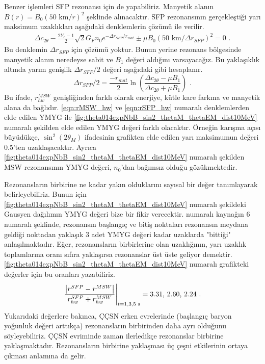 Benzer işlemleri SFP rezonansı için de yapabiliriz. Manyetik alanın $ B(r) = B_{0}(50 \text{ km}/r)^{2} $ şeklinde alınacaktır. SFP rezonansının gerçekleştiği yarı maksimum uzaklıkları aşağıdaki denklemlerin çözümü ile verilir.
\begin{align}
    \Delta c_{2\theta} - \frac{2Y_{e}-1}{2}\sqrt{2}G_{F}n_{0}e^{-\Delta r_{SFP}/r_{mat}}\pm \mu B_{0}(50 \text{ km}/\Delta r_{SFP})^{2} = 0\text{ .}
\end{align}
Bu denklemin $ \Delta r_{SFP} $ için çözümü yoktur. Bunun yerine rezonans bölgesinde manyetik alanın neredeyse sabit ve $ B_{1} $ değeri aldığını varsayacağız. Bu yaklaşıklık altında yarım genişlik $ \Delta r_{SFP}/2 $ değeri aşağıdaki gibi hesaplanır.
\begin{equation}\label{eqn:rSFP_hw}
    \Delta r_{SFP}/2 = \frac{-r_{mat}}{2} \ln(\frac{\Delta c_{2\theta}-\mu B_{1}}{\Delta c_{2\theta}+\mu B_{1}})\text{ .}
\end{equation}
Bu ifade, $ r^{MSW}_{hw} $ genişliğinden farklı olarak enerjiye, kütle kare farkına ve manyetik alana da bağlıdır. \eqref{eqn:rMSW_hw} ve \eqref{eqn:rSFP_hw} numaralı denklemlerden elde edilen YMYG ile \ref{fig:theta014expNbB_sin2_thetaM_thetaEM_dist10MeV} numaralı şekilden elde edilen YMYG değeri farklı olacaktır. Örneğin karışma açısı büyüdükçe, $ \sin^{2}(2\theta_{M}) $ ifadesinin grafikten elde edilen yarı maksimumun değeri $ 0.5 $'ten uzaklaşacaktır. Ayrıca \ref{fig:theta014expNbB_sin2_thetaM_thetaEM_dist10MeV} numaralı şekilden MSW rezonansının YMYG değeri, $ n_{0} $'dan bağımsız olduğu gözükmektedir.

Rezonansların birbirine ne kadar yakın olduklarını sayısal bir değer tanımlayarak belirleyebiliriz. Bunun için \ref{fig:theta014expNbB_sin2_thetaM_thetaEM_dist10MeV} numaralı şekildeki Gausyen dağılımın YMYG değeri bize bir fikir verecektir. \cite{Smirnov:2003da} numaralı kaynağın 6 numaralı şeklinde, rezonansın başlangıç ve bitiş noktaları rezonansın meydana geldiği noktadan yaklaşık $3$ adet YMYG değeri kadar uzaklarda "bittiği" anlaşılmaktadır. Eğer, rezonansların birbirlerine olan uzaklığının, yarı uzaklık toplamlarına oranı sıfıra yaklaşırsa rezonanslar üst üste geliyor demektir. \ref{fig:theta014expNbB_sin2_thetaM_thetaEM_dist10MeV} numaralı grafikteki değerler için bu oranları yazabiliriz.
\begin{align}\label{eqn:resonansYakinlasmaOranı}
    \eval{\frac{\abs{r^{SFP} - r^{MSW}}}{r^{SFP}_{hw}+r^{MSW}_{hw}}}_{t=1,3,5 \text{ s}} = 3.31\text{, } 2.60\text{, } 2.24 \text{ .}
\end{align}
Yukarıdaki değerlere bakınca, ÇÇSN erken evrelerinde (başlangıç baryon yoğunluk değeri arttıkça) rezonansların birbirinden daha ayrı olduğunu söyleyebiliriz. ÇÇSN evriminde zaman ilerledikçe rezonanslar birbirine yaklaşmaktadır. Rezonansların birbirine yaklaşması üç çeşni etkilerinin ortaya çıkması anlamına da gelir.

